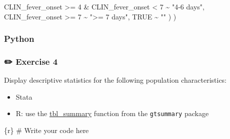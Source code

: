 \documentclass[
  letterpaper,
  DIV=11,
  numbers=noendperiod,
  oneside]{scrreprt}
\newenvironment{Shaded}{\begin{snugshade}}{\end{snugshade}}
\newcommand{\CommentTok}[1]{\textcolor[rgb]{0.37,0.37,0.37}{#1}}
\newcommand{\ConstantTok}[1]{\textcolor[rgb]{0.56,0.35,0.01}{#1}}
\newcommand{\DecValTok}[1]{\textcolor[rgb]{0.68,0.00,0.00}{#1}}
\newcommand{\InformationTok}[1]{\textcolor[rgb]{0.37,0.37,0.37}{#1}}
\newcommand{\NormalTok}[1]{\textcolor[rgb]{0.00,0.23,0.31}{#1}}
\newcommand{\SpecialCharTok}[1]{\textcolor[rgb]{0.37,0.37,0.37}{#1}}
\newcommand{\StringTok}[1]{\textcolor[rgb]{0.13,0.47,0.30}{#1}}
\providecommand{\tightlist}{%
  \setlength{\itemsep}{0pt}\setlength{\parskip}{0pt}}\usepackage{longtable,booktabs,array}
\begin{document}
\begin{Shaded}
\begin{Highlighting}[]
\NormalTok{      CLIN\_fever\_onset }\SpecialCharTok{\textgreater{}=} \DecValTok{4} \SpecialCharTok{\&}\NormalTok{ CLIN\_fever\_onset }\SpecialCharTok{\textless{}} \DecValTok{7} \SpecialCharTok{\textasciitilde{}} \StringTok{"4{-}6 days"}\NormalTok{,}
\NormalTok{      CLIN\_fever\_onset }\SpecialCharTok{\textgreater{}=} \DecValTok{7} \SpecialCharTok{\textasciitilde{}} \StringTok{"\textgreater{}= 7 days"}\NormalTok{,}
      \ConstantTok{TRUE} \SpecialCharTok{\textasciitilde{}} \StringTok{""}
\NormalTok{    )}
\NormalTok{  )}
\InformationTok{\textasciigrave{}\textasciigrave{}\textasciigrave{}}
\end{Highlighting}
\end{Shaded}

\subsubsection{Python}

\subsubsection{\texorpdfstring{{✏️} Exercise 4}{✏️ Exercise 4}}

Display descriptive statistics for the following population
characteristics:

\begin{tcolorbox}[enhanced jigsaw, coltitle=black, opacityback=0, title=\textcolor{quarto-callout-tip-color}{\faLightbulb}\hspace{0.5em}{Tip}, toprule=.15mm, bottomtitle=1mm, colbacktitle=quarto-callout-tip-color!10!white, colframe=quarto-callout-tip-color-frame, left=2mm, opacitybacktitle=0.6, bottomrule=.15mm, arc=.35mm, toptitle=1mm, colback=white, titlerule=0mm, breakable, leftrule=.75mm, rightrule=.15mm]

\begin{itemize}
\tightlist
\item
  Stata
\item
  R: use the
  \href{https://www.danieldsjoberg.com/gtsummary/reference/tbl_summary.html}{tbl\_summary}
  function from the \texttt{gtsummary} package
\end{itemize}

\end{tcolorbox}

\begin{Shaded}
\begin{Highlighting}[]
\InformationTok{\textasciigrave{}\textasciigrave{}\textasciigrave{}\{r\}}
\CommentTok{\# Write your code here}
\InformationTok{\textasciigrave{}\textasciigrave{}\textasciigrave{}}
\end{Highlighting}
\end{Shaded}
\end{document}
